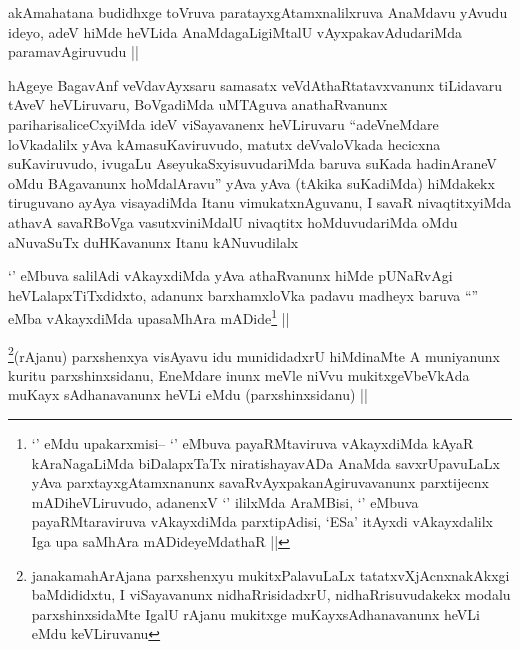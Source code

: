 
\begin{artha}
akAmahatana budidhxge toVruva paratayxgAtamxnalilxruva AnaMdavu yAvudu
ideyo, adeV hiMde heVLida AnaMdagaLigiMtalU vAyxpakavAdudariMda
paramavAgiruvudu ||
\end{artha}


\begin{artha}
hAgeye BagavAnf veVdavAyxsaru samasatx veVdAthaRtatavxvanunx
tiLidavaru tAveV heVLiruvaru, BoVgadiMda uMTAguva anathaRvanunx
pariharisaliceCxyiMda ideV viSayavanenx heVLiruvaru ``adeVneMdare
loVkadalilx yAva kAmasuKaviruvudo, matutx deVvaloVkada hecicxna
suKaviruvudo, ivugaLu AseyukaSxyisuvudariMda baruva suKada hadinAraneV
oMdu BAgavanunx hoMdalAravu'' yAva yAva (tAkika suKadiMda) hiMdakekx
tiruguvano ayAya visayadiMda Itanu vimukatxnAguvanu, I savaR
nivaqtitxyiMda athavA savaRBoVga vasutxviniMdalU nivaqtitx
hoMduvudariMda oMdu aNuvaSuTx duHKavanunx Itanu kANuvudilalx 
\end{artha}


\begin{artha}
`\stext' eMbuva salilAdi vAkayxdiMda yAva athaRvanunx hiMde pUNaRvAgi
  heVLalapxTiTxdidxto, adanunx barxhamxloVka padavu madheyx baruva
  ``\stext'' eMba vAkayxdiMda upasaMhAra mADide\footnote[1]{`\stext'
    eMdu upakarxmisi-- `\stext' eMbuva payaRMtaviruva vAkayxdiMda
    kAyaR kAraNagaLiMda biDalapxTaTx niratishayavADa AnaMda
    savxrUpavuLaLx yAva parxtayxgAtamxnanunx
    savaRvAyxpakanAgiruvavanunx parxtijecnx mADiheVLiruvudo, adanenxV
    `\stext' ililxMda AraMBisi, `\stext' eMbuva payaRMtaraviruva
    vAkayxdiMda parxtipAdisi, `ESa' itAyxdi vAkayxdalilx Iga upa
    saMhAra mADideyeMdathaR ||} ||
\end{artha}


\begin{artha}
\footnote[2]{janakamahArAjana parxshenxyu mukitxPalavuLaLx
  tatatxvXjAcnxnakAkxgi baMdididxtu, I viSayavanunx nidhaRrisidadxrU,
  nidhaRrisuvudakekx modalu parxshinxsidaMte IgalU rAjanu mukitxge
  muKayxsAdhanavanunx heVLi eMdu keVLiruvanu}(rAjanu) parxshenxya visAyavu idu munididadxrU hiMdinaMte
A muniyanunx kuritu parxshinxsidanu, EneMdare inunx meVle niVvu
mukitxgeVbeVkAda muKayx sAdhanavanunx heVLi eMdu (parxshinxsidanu) ||
\end{artha}

